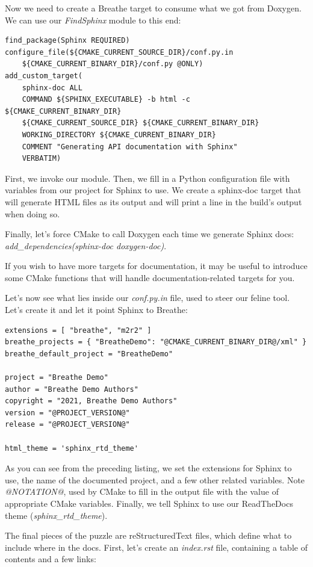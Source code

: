 Now we need to create a Breathe target to consume what we got from Doxygen. We can use our \textit{FindSphinx} module to this end:

\begin{lstlisting}[style=styleCMake]
find_package(Sphinx REQUIRED)
configure_file(${CMAKE_CURRENT_SOURCE_DIR}/conf.py.in
	${CMAKE_CURRENT_BINARY_DIR}/conf.py @ONLY)
add_custom_target(
	sphinx-doc ALL
	COMMAND ${SPHINX_EXECUTABLE} -b html -c ${CMAKE_CURRENT_BINARY_DIR}
	${CMAKE_CURRENT_SOURCE_DIR} ${CMAKE_CURRENT_BINARY_DIR}
	WORKING_DIRECTORY ${CMAKE_CURRENT_BINARY_DIR}
	COMMENT "Generating API documentation with Sphinx"
	VERBATIM)
\end{lstlisting}

First, we invoke our module. Then, we fill in a Python configuration file with variables from our project for Sphinx to use. We create a sphinx-doc target that will generate HTML files as its output and will print a line in the build's output when doing so.

Finally, let's force CMake to call Doxygen each time we generate Sphinx docs: \textit{add\_dependencies(sphinx-doc doxygen-doc)}.

If you wish to have more targets for documentation, it may be useful to introduce some CMake functions that will handle documentation-related targets for you.

Let's now see what lies inside our \textit{conf.py.in} file, used to steer our feline tool. Let's create it and let it point Sphinx to Breathe:

\begin{lstlisting}[style=stylePython]
extensions = [ "breathe", "m2r2" ]
breathe_projects = { "BreatheDemo": "@CMAKE_CURRENT_BINARY_DIR@/xml" }
breathe_default_project = "BreatheDemo"

project = "Breathe Demo"
author = "Breathe Demo Authors"
copyright = "2021, Breathe Demo Authors"
version = "@PROJECT_VERSION@"
release = "@PROJECT_VERSION@"

html_theme = 'sphinx_rtd_theme'
\end{lstlisting}

As you can see from the preceding listing, we set the extensions for Sphinx to use, the name of the documented project, and a few other related variables. Note \textit{@NOTATION@}, used by CMake to fill in the output file with the value of appropriate CMake variables. Finally, we tell Sphinx to use our ReadTheDocs theme (\textit{sphinx\_rtd\_theme}).

The final pieces of the puzzle are reStructuredText files, which define what to include where in the docs. First, let's create an \textit{index.rst} file, containing a table of contents and a few links:

